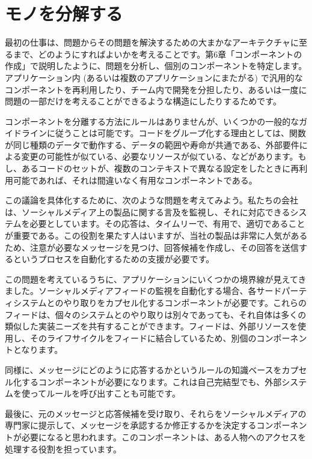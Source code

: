 \section{モノを分解する}

最初の仕事は、問題からその問題を解決するための大まかなアーキテクチャに至るまで、どのようにすればよいかを考えることです。第6章「コンポーネントの作成」で説明したように、問題を分析し、個別のコンポーネントを特定します。アプリケーション内 (あるいは複数のアプリケーションにまたがる) で汎用的なコンポーネントを再利用したり、チーム内で開発を分担したり、あるいは一度に問題の一部だけを考えることができるような構造にしたりするためです。

コンポーネントを分離する方法にルールはありませんが、いくつかの一般的なガイドラインに従うことは可能です。コードをグループ化する理由としては、関数が同じ種類のデータで動作する、データの範囲や寿命が共通である、外部要件による変更の可能性が似ている、必要なリソースが似ている、などがあります。もし、あるコードのセットが、複数のコンテキストで異なる設定をしたときに再利用可能であれば、それは間違いなく有用なコンポーネントである。

この議論を具体化するために、次のような問題を考えてみよう。私たちの会社は、ソーシャルメディア上の製品に関する言及を監視し、それに対応できるシステムを必要としています。その応答は、タイムリーで、有用で、適切であることが重要である。この役割を果たす人はいますが、当社の製品は非常に人気があるため、注意が必要なメッセージを見つけ、回答候補を作成し、その回答を送信するというプロセスを自動化するための支援が必要です。

この問題を考えているうちに、アプリケーションにいくつかの境界線が見えてきました。ソーシャルメディアフィードの監視を自動化する場合、各サードパーティシステムとのやり取りをカプセル化するコンポーネントが必要です。これらのフィードは、個々のシステムとのやり取りは別々であっても、それ自体は多くの類似した実装ニーズを共有することができます。フィードは、外部リソースを使用し、そのライフサイクルをフィードに結合しているため、別個のコンポーネントとなります。

同様に、メッセージにどのように応答するかというルールの知識ベースをカプセル化するコンポーネントが必要になります。これは自己完結型でも、外部システムを使ってルールを呼び出すことも可能です。

最後に、元のメッセージと応答候補を受け取り、それらをソーシャルメディアの専門家に提示して、メッセージを承認するか修正するかを決定するコンポーネントが必要になると思われます。このコンポーネントは、ある人物へのアクセスを処理する役割を担っています。

